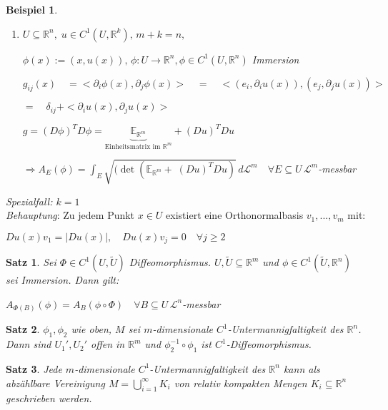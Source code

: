 \documentclass[11pt]{memoir}
\theoremstyle{changebreak}
\newtheorem{Beispiel}{Beispiel}[chapter]
\newtheorem{Satz}{Satz}[chapter]
\begin{document}
\begin{Beispiel}
\begin{enumerate}
	\item $U \subseteq \mathbb R^n, \;u \in C^1(U, \mathbb R^k), \, m+k =n,$
	\par
	$ \phi(x) := (x, u(x)), \, \phi: U \rightarrow \mathbb R^n, \phi \in C^1(U, \mathbb R^n)$ Immersion
	\par
	$g_{ij}(x) \quad = <\partial_i \phi(x), \partial_j \phi(x)> \quad=\quad <(e_i, \partial_i u(x)), (e_j, \partial_j u(x))> \quad$
	\par
	$= \quad \delta_{ij} + <\partial_i u(x), \partial_j u(x)> $
	\par
	$g = (D\phi)^T D\phi = \underbrace{\mathbb E_{\mathbb R^m}}_{\text{Einheitsmatrix im }\mathbb R^m} + (Du)^TDu$  \\%
	\par\bigskip
	$\Rightarrow A_E(\phi) = \int_E \sqrt{(\det(\mathbb E_{\mathbb R^m} +\; (Du)^TDu)}\,d\mathscr L^m \quad \forall E \subseteq U\, \mathscr L^m$-messbar
\end{enumerate}
\end{Beispiel}

\par\bigskip
\emph{Spezialfall: $k=1$} \\
\emph{Behauptung}: Zu jedem Punkt $x \in U$ existiert eine Orthonormalbasis $v_1, ... , v_m$ mit:
\begin{center}
	$Du(x) v_1 = |Du(x)|, \quad Du(x) v_j = 0\quad \forall j \geq 2$
\end{center}


\begin{Satz}
Sei $\Phi \in C^1(U, \tilde U)$ Diffeomorphismus. $U, \tilde U \subseteq \mathbb R^m$ und $\phi \in C^1(\tilde U, \mathbb R^n)$ sei Immersion. Dann gilt:
\begin{center}
	$A_{\Phi(B)}(\phi) = A_B (\phi \circ \Phi) \quad \forall B \subseteq U \, \mathscr L^n$-messbar
\end{center}
\end{Satz}

\begin{Satz}
$\phi_1, \phi_2$ wie oben, $M$ sei $m$-dimensionale $C^1$-Untermannigfaltigkeit des $\mathbb R^n$. Dann sind $U_1 ', U_2 '$ offen in $\mathbb R^m$ und $\phi_2^{-1}\circ \phi_1$ ist $C^1$-Diffeomorphismus.
\end{Satz}

\begin{Satz}
Jede $m$-dimensionale $C^1$-Untermannigfaltigkeit des $\mathbb R^n$ kann als abzählbare Vereinigung $M = \bigcup\limits_{i=1}^\infty K_i$ von relativ kompakten Mengen $K_i \subseteq \mathbb R^n$ geschrieben werden.
\end{Satz}
\end{document}
